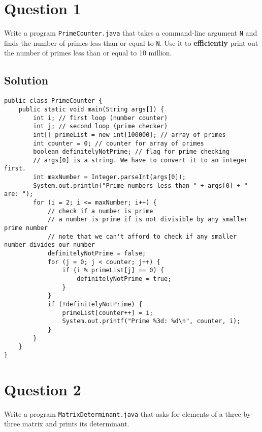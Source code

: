 \section*{Question 1}
Write a program \texttt{PrimeCounter.java} that takes a command-line argument \texttt{N} and finds the number of primes less than or equal to \texttt{N}. Use it to \textbf{efficiently} print out the number of primes less than or equal to 10 million.

\subsection*{Solution}
\lstset{language=Java,tabsize=2}
\begin{lstlisting}
public class PrimeCounter {
	public static void main(String args[]) {
		int i; // first loop (number counter)
		int j; // second loop (prime checker)
		int[] primeList = new int[100000]; // array of primes
		int counter = 0; // counter for array of primes
		boolean definitelyNotPrime; // flag for prime checking
		// args[0] is a string. We have to convert it to an integer first.
		int maxNumber = Integer.parseInt(args[0]);		
		System.out.println("Prime numbers less than " + args[0] + " are: ");
		for (i = 2; i <= maxNumber; i++) {
			// check if a number is prime
			// a number is prime if is not divisible by any smaller prime number
			// note that we can't afford to check if any smaller number divides our number
			definitelyNotPrime = false;
			for (j = 0; j < counter; j++) {
				if (i % primeList[j] == 0) {
					definitelyNotPrime = true;
				}
			}
			if (!definitelyNotPrime) {
				primeList[counter++] = i;
				System.out.printf("Prime %3d: %d\n", counter, i);
			}
		}
	}
}
\end{lstlisting}
\section*{Question 2}
Write a program \texttt{MatrixDeterminant.java} that asks for elements of a three-by-three matrix and prints its determinant.

